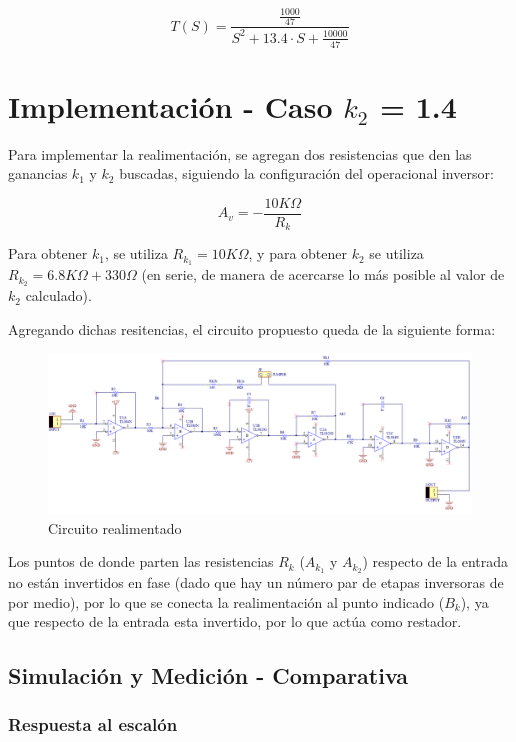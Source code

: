 \documentclass{article}
\begin{document}
\[
T(S) = \frac{\frac{1000}{47}}{S^2 + 13.4 \cdot S + \frac{10000}{47}}
\]

\section{Implementación - Caso $k_2$ = 1.4}

Para implementar la realimentación, se agregan dos resistencias que den las ganancias $k_1$ y $k_2$ buscadas, siguiendo la configuración del operacional inversor:

\[
A_v = -\frac{10K\Omega}{R_k} 
\] 

Para obtener $k_1$, se utiliza $R_{k_1} = 10K\Omega$, y para obtener $k_2$ se utiliza $R_{k_2} = 6.8K\Omega + 330\Omega$ (en serie, de manera de acercarse lo más posible al valor de $k_2$ calculado).

\newpage

Agregando dichas resitencias, el circuito propuesto queda de la siguiente forma:

\begin{figure}[H]
\centering
\includegraphics[width=1\linewidth]{Imagenes/CircuitoRealimentado.png}
\caption{Circuito realimentado}
\label{fig:Circuito}
\end{figure}

Los puntos de donde parten las resistencias $R_k$ ($A_{k_1}$ y $A_{k_2}$) respecto de la entrada no están invertidos en fase (dado que hay un número par de etapas inversoras de por medio), por lo que se conecta la realimentación al punto indicado ($B_k$), ya que respecto de la entrada esta invertido, por lo que actúa como restador.

\subsection{Simulación y Medición - Comparativa}

\subsubsection{Respuesta al escalón}
\end{document}
